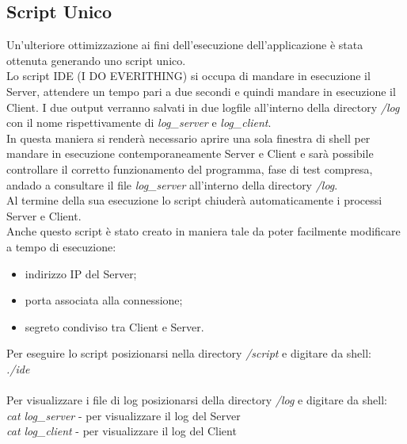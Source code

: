 \documentclass[12pt, a4paper]{article}
\begin{document}
\subsection{Script Unico}
Un'ulteriore ottimizzazione ai fini dell'esecuzione dell'applicazione è stata ottenuta generando uno script unico.\\
Lo script IDE (I DO EVERITHING) si occupa di mandare in esecuzione il Server, attendere un tempo pari a due secondi e quindi mandare in esecuzione il Client. I due output verranno salvati in due logfile all'interno della directory \textit{/log} con il nome rispettivamente di \textit{log\_server} e \textit{log\_client}.\\
In questa maniera si renderà necessario aprire una sola finestra di shell per mandare in esecuzione contemporaneamente Server e Client e sarà possibile controllare il corretto funzionamento del programma, fase di test compresa, andado a consultare il file \textit{log\_server} all'interno della directory \textit{/log}.\\
Al termine della sua esecuzione lo script chiuderà automaticamente i processi Server e Client.\\
Anche questo script è stato creato in maniera tale da poter facilmente modificare a tempo di esecuzione:
\begin{itemize}
\item
indirizzo IP del Server;
\item
porta associata alla connessione;
\item
segreto condiviso tra Client e Server.
\end{itemize}
Per eseguire lo script posizionarsi nella directory \textit{/script} e digitare da shell:\\
\textit{./ide}\\\\
Per visualizzare i file di log posizionarsi della directory \textit{/log} e digitare da shell:\\
\textit{cat  log\_server} - per visualizzare il log del Server\\
\textit{cat log\_client} - per visualizzare il log del Client  
\end{document}
